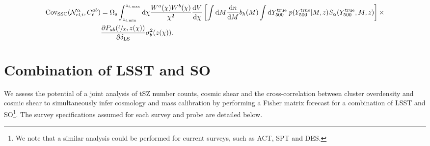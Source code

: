 \documentclass[%
 reprint,
nofootinbib,
 amsmath,amssymb,
 aps,
]{revtex4-1}
\begin{document}
\begin{widetext}
\begin{equation}
\begin{aligned}
\mathrm{Cov}_{\mathrm{SSC}}(\mathcal{N}^{\alpha}_{\mathrm{cl}, i}, C^{ab}_{\ell}) &= \Omega_{s} \int_{z_{i, \mathrm{min}}}^{z_{i, \mathrm{max}}} \mathrm{d}\chi \frac{W^{a}(\chi)W^{b}(\chi)}{\chi^{2}} \frac{\mathrm{d}V}{\mathrm{d}\chi} \left[\int \mathrm{d}M \frac{\mathrm{d}n}{\mathrm{d}M} b_{h}(M) \int \mathrm{d}Y_{500}^{\mathrm{true}}\; p(Y_{500}^{\mathrm{true}}|M, z) S_{\alpha}(Y_{500}^{\mathrm{true}}, M, z)\right] \times \\
&\frac{\partial P_{ab}(\sfrac{\ell}{\chi}, z(\chi))}{\partial \delta_{\rm LS}}\sigma^{2}_{b}(z(\chi)).
\end{aligned}
\end{equation}
\end{widetext}

\section{Combination of LSST and SO}\label{sec:lsstxso}

We assess the potential of a joint analysis of tSZ number counts, cosmic shear and the cross-correlation between cluster overdensity and cosmic shear to simultaneously infer cosmology and mass calibration by performing a Fisher matrix forecast for a combination of LSST and SO\footnote{We note that a similar analysis could be performed for current surveys, such as ACT, SPT and DES.}. The survey specifications assumed for each survey and probe are detailed below.
\end{document}
